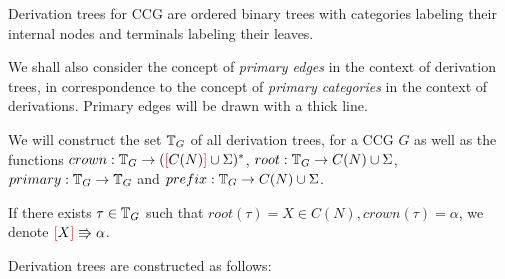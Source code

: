 \documentclass[main.tex]{subfiles}
\begin{document}
Derivation trees for CCG are ordered binary trees with categories labeling
their internal nodes and terminals labeling their leaves.

We shall also consider the concept of \emph{primary edges} in the context
of derivation trees, in correspondence to the concept of
\emph{primary categories} in the context of derivations. Primary edges
will be drawn with a thick line.

We will construct the set $ \mathbb{T}_{ G } $ of all derivation trees, for a
CCG $G$ as well
as the functions $ crown: \mathbb{T}_{ G } \rightarrow ( \textcolor{red}{[} C(N) \textcolor{red}{]} \cup \Sigma )^* $,
$ root: \mathbb{T}_{ G } \rightarrow C(N) \cup \Sigma$,
$ primary : \mathbb{T}_{ G } \rightarrow \mathbb{T}_{ G } $ and
$ prefix : \mathbb{T}_{ G } \rightarrow C(N) \cup \Sigma $.

If there exists $\tau \in \mathbb{T}_{ G }$ such that $root(\tau) = X \in C(N),
crown(\tau) = \alpha$, we denote $\textcolor{red}{[} X \textcolor{red}{]} \Rrightarrow \alpha$.

Derivation trees are constructed as follows:
\end{document}
